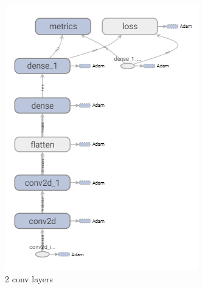 \begin{figure}
	\centering
	\begin{subfigure}[b]{0.3\linewidth}
		\includegraphics[width=\linewidth]{plots/cnn-candidates-2-conv.png}
		\caption{2 conv layers}
	\end{subfigure}
	\begin{subfigure}[b]{0.3\linewidth}

\end{subfigure}
\end{figure}
